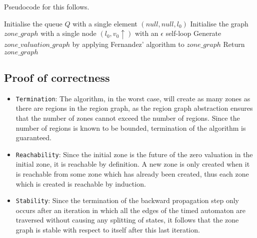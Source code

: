 Pseudocode for this follows.

\begin{algorithm2e}[H]
  Initialise the queue $Q$ with a single element $(null, null, l_0)$\;
  Initialise the graph $zone\_graph$ with a single node $(l_0, v_0 \uparrow)$
  with an $\epsilon$ self-loop\;
  Generate $zone\_valuation\_graph$ by applying Fernandez' algorithm to $zone\_graph$\;
  Return $zone\_graph$\;
\end{algorithm2e}

\subsection{Proof of correctness}

\begin{itemize}

\item \texttt{Termination}: The algorithm, in the worst case,
  will create as many zones as there are regions in the region graph,
  as the region graph abstraction ensures that the number of zones
  cannot exceed the number of regions. Since the number of regions is
  known to be bounded, termination of the algorithm is
  guaranteed.

\item \texttt{Reachability}: Since the initial zone is the future of
  the zero valuation in the initial zone, it is reachable by
  definition. A new zone is only created when it is reachable from some
  zone which has already been created, thus each zone which is created
  is reachable by induction.

\item \texttt{Stability}: Since the termination of the backward
  propagation step only occurs after an iteration in which all the
  edges of the timed automaton are traversed without causing any
  splitting of states, it follows that the zone graph is stable with
  respect to itself after this last iteration.

\end{itemize}

